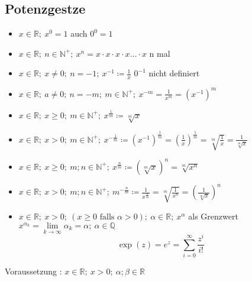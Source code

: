 \documentclass[12pt,a4paper]{article}
\begin{document}
\subsection{Potenzgestze}
\begin{itemize}
	\item $x \in \mathbb{R};\ x^0 = 1$ auch $0^0=1$
	\item $x \in \mathbb{R};\ n \in \mathbb{N}^+;\ x^n = x \cdot x \cdot x \cdot x \dots \cdot x$ n mal
	\item $x \in \mathbb{R};\ x \not = 0;\ n = -1;\ x^{-1} \coloneqq \frac{1}{x}$ $0^{-1}$ nicht definiert
	\item $x \in \mathbb{R};\ a \not = 0;\ n = -m;\ m \in \mathbb{N}^+;\ x^{-m} = \frac{1}{x^{m}} = (x^{-1})^m$
	\item $x \in \mathbb{R};\ x \geq 0;\ m \in \mathbb{N}^+;\ x^{\frac{1}{m}} \coloneqq \sqrt[m]{x}$
	\item $x \in\mathbb{R};\ x > 0;\ m \in \mathbb{N}^+;\ x^{-\frac{1}{m}} \coloneqq (x^{-1})^{\frac{1}{m}}= (\frac{1}{x})^{\frac{1}{m}}=\sqrt[m]{\frac{1}{x}} = \frac{1}{\sqrt[m]{x}}$
	\item $x \in\mathbb{R};\ x \geq 0;\ m;n \in \mathbb{N}^+;\ x^{\frac{n}{m}} \coloneqq \left(\sqrt[m]{x}\right)^n = \sqrt[m]{x^n}$
	\item $x \in \mathbb{R};\ x > 0;\ m;n \in \mathbb{N}^+;\ m^{-\frac{n}{m}} \coloneqq \frac{1}{x^{\frac{n}{m}}} = \sqrt[m]{\frac{1}{x^n}} = \left(\frac{1}{\sqrt[m]{x}}\right)^n$
	\item $x \in \mathbb{R};\ x > 0;\ (x \geq 0 \textrm{ falls } \alpha > 0);\ \alpha \in \mathbb{R};\ x^\alpha$ als Grenzwert $x^{\alpha_k} = \lim\limits_{k \to \infty}\alpha_k = \alpha;\ \alpha \in \mathbb{Q}$
	      $$\exp(z) = e^z = \sum\limits_{i = 0}^\infty \frac{z^i}{i!}$$
\end{itemize}
Voraussetzung : $x \in \mathbb{R};\ x > 0;\ \alpha; \beta \in \mathbb{R}$
\end{document}
